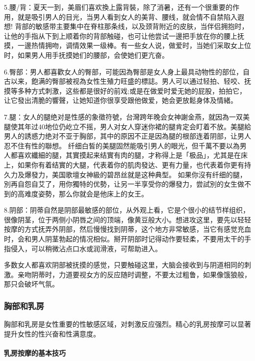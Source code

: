 \documentclass[12pt,UTF8]{ctexbook}
\begin{document}
5.腰/背：夏天一到，美眉们喜欢換上露背裝，除了消暑，还有一个很重要的作用，就是吸引男人的目光，当男人看到女人的美背、腰线，就会情不自禁陷入遐想!
背部的敏感带主要集中在脊柱那条线，以及颈背附近的皮肤，当伴侣拥抱时，让他的手指从下到上顺着你的背部触碰，也可让他尝试一邊把手放在你的腰上抚摸，一邊热情拥吻，调情效果一级棒。有一些女人说，做爱时，当她们采取女上位时，如果男人用手抚摸她们的腰部，会使她们更亢奋。

6.臀部：男人都喜歡女人的臀部，可能因為臀部是女人身上最具动物性的部位，自古以来，飽满的臀部被视為女性生殖力旺盛的標誌。男人可以通过轻拍、轻咬、抚摸等多种方式刺激，这些都是很好的前戏;或是在做爱时爱无她的屁股，拍拍它，让它發出清脆的響聲，让她知道你很享受跟他做爱，她会更放鬆身体及情緒。

7.腿：女人的腿绝对是性感的象徵符號，台灣跨年晚会女神謝金燕，就因為一双美腿使其年过40地位仍屹立不摇，男人对女人穿迷你裙的腿肯定会盯着不放。美腿給男人的誘惑力绝对不亚于胸部，其中的原因不正是因為腿的根部连着阴部，让男人忍不住有性的聯想。
纤细白皙的美腿固然能吸引男人的眼光，但千萬不要以為男人都喜欢纖細的腿，其實摸起来结實有肉的腿，才称得上是「极品」，尤其是在床上，如果你有着结實的大腿，代表着你的肌肉發达、更有力量，也代表着你更有持久力及爆發力，美国歌壇女神級的碧昂丝就是这种典型。
如果你沒有纤细的腿，別再自怨自艾了，用你獨特的优勢，让另一半享受你的爆發力，尝試別的女生做不到的高难度姿勢，那么你就会是他床上的女王。

8.阴部：阴蒂自然是阴部最敏感的部位，从外观上看，它是个很小的结节样组织，很像阴茎，位于两侧小阴唇之间的顶端，像黄豆般大小。想进攻这里，要先以轻轻按摩的方式抚弄外阴部，然后慢慢找到阴蒂，这个地方非常敏感，当它有感觉充血时，会和男人阴茎勃起的情况相似。掰开阴部时记得动作要轻柔，不要用太干的手指侵入，可以稍微沾点口水或润滑液，可帮助进入。

多数女人都喜欢阴部被抚摸的感觉，只要触碰这里，大脑会接收到与阴道相同的刺激。亲吻阴蒂时，力道要视女方的反应随时调整，不要太过粗鲁，如果像饿狼般，那只会破坏气氛。

\subsubsection{胸部和乳房}

胸部和乳房是女性重要的性敏感区域，对刺激反应强烈。精心的乳房按摩可以显著提升女性的性兴奋和性满意度。

\paragraph{乳房按摩的基本技巧}
\end{document}
